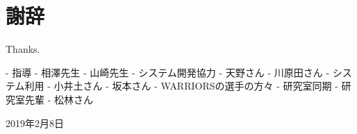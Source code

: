 \newpage
\thispagestyle{empty}

\chapter*{謝辞}

Thanks.

- 指導
  - 相澤先生
  - 山崎先生
- システム開発協力
  - 天野さん
  - 川原田さん
- システム利用
  - 小井土さん
  - 坂本さん
  - WARRIORSの選手の方々
- 研究室同期
- 研究室先輩
- 松林さん

\begin{flushright}
  \vspace{15mm}
  2019年2月8日 \hspace{2cm}
\end{flushright}
